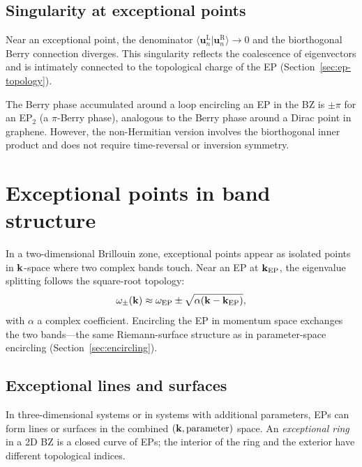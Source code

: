 \subsection{Singularity at exceptional points}
\label{ssec:berry-ep}

Near an exceptional point, the denominator
$\langle\mathbf{u}_n^{\mathrm{L}}|\mathbf{u}_n^{\mathrm{R}}\rangle \to 0$
and the biorthogonal Berry connection diverges. This singularity reflects
the coalescence of eigenvectors and is intimately connected to the
topological charge of the EP (Section~\ref{sec:ep-topology}).

The Berry phase accumulated around a loop encircling an EP in the BZ is
$\pm\pi$ for an EP$_2$ (a $\pi$-Berry phase), analogous to the Berry
phase around a Dirac point in graphene. However, the non-Hermitian
version involves the biorthogonal inner product and does not require
time-reversal or inversion symmetry.


\section{Exceptional points in band structure}
\label{sec:ep-bands}

In a two-dimensional Brillouin zone, exceptional points appear as
isolated points in $\mathbf{k}$-space where two complex bands touch. Near an
EP at $\mathbf{k}_{\mathrm{EP}}$, the eigenvalue splitting follows the
square-root topology:
\begin{equation}
 \omega_\pm(\mathbf{k}) \approx \omega_{\mathrm{EP}}
 \pm \sqrt{\alpha(\mathbf{k} - \mathbf{k}_{\mathrm{EP}})},
 \label{eq:ep-band-splitting}
\end{equation}
with $\alpha$ a complex coefficient. Encircling the EP in momentum space
exchanges the two bands---the same Riemann-surface structure as in
parameter-space encircling (Section~\ref{sec:encircling}).

\subsection{Exceptional lines and surfaces}
\label{ssec:ep-lines}

In three-dimensional systems or in systems with additional parameters,
EPs can form lines or surfaces in the combined $(\mathbf{k}, \text{parameter})$
space. An \emph{exceptional ring} in a 2D BZ is a closed curve of EPs;
the interior of the ring and the exterior have different topological
indices.

